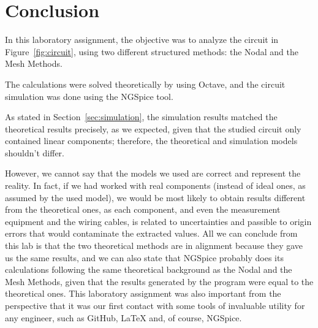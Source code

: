 \section{Conclusion}
\label{sec:conclusion}

In this laboratory assignment, the objective was to analyze the circuit in Figure~\ref{fig:circuit}, using two different structured methods: the Nodal and the Mesh Methods. 

The calculations were solved theoretically by using Octave, and the circuit simulation was done using the NGSpice tool.

As stated in Section~\ref{sec:simulation}, the simulation results matched the theoretical results
precisely, as we expected, given that the studied circuit only contained linear components; therefore, the theoretical
and simulation models shouldn't differ. 

However, we cannot say that the models we used are correct and represent the reality. In fact, if we had worked with real components (instead of ideal ones, as assumed by the used model), we would be most likely to obtain results different from the theoretical ones, as each component, and even the measurement equipment and the wiring cables, is related to uncertainties and passible to origin errors that would contaminate the extracted values. All we can conclude from this lab is that the two theoretical methods are in alignment because they gave us the same results, and we can also state that NGSpice probably does its calculations following the same theoretical background as the Nodal and the Mesh Methods, given that the results generated by the program were equal to the theoretical ones.
This laboratory assignment was also important from the perspective that it was our first contact with some tools of invaluable utility for any engineer, such as GitHub, LaTeX and, of course, NGSpice.
